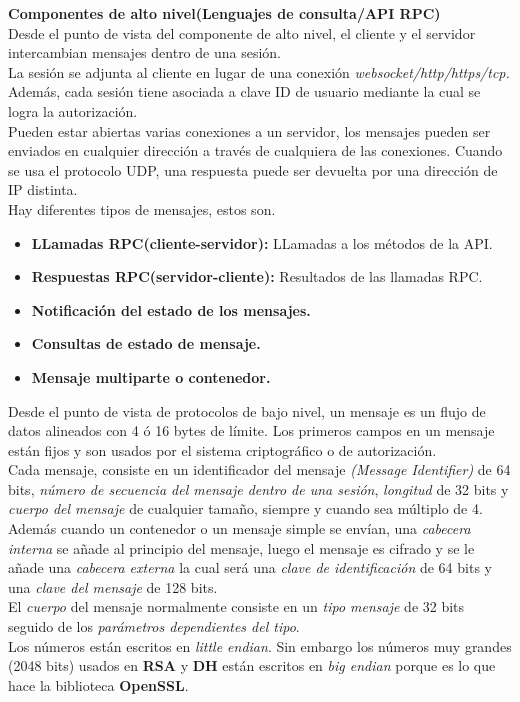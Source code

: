 \textbf{Componentes de alto nivel(Lenguajes de consulta/API RPC)}\\
Desde el punto de vista del componente de alto nivel, el cliente y el servidor intercambian mensajes dentro de una sesión.\\
La sesión se adjunta al cliente en lugar de una conexión \emph{websocket/http/https/tcp.} 
Además, cada sesión tiene asociada a clave ID de usuario mediante la cual se logra la autorización.\\ 
Pueden estar abiertas varias conexiones a un servidor, los mensajes pueden ser enviados en cualquier dirección a través de cualquiera de las conexiones.
Cuando se usa el protocolo UDP, una respuesta puede ser devuelta por una dirección de IP distinta.\\
Hay diferentes tipos de mensajes, estos son.
\begin{itemize}
		\item \textbf{LLamadas RPC(cliente-servidor):} LLamadas a los métodos de la API.
		\item \textbf{Respuestas RPC(servidor-cliente):} Resultados de las llamadas RPC.
		\item \textbf{Notificación del estado de los mensajes.}
		\item \textbf{Consultas de estado de mensaje.}
		\item \textbf{Mensaje multiparte o contenedor.}
\end{itemize}
Desde el punto de vista de protocolos de bajo nivel, un mensaje es un flujo de datos alineados con 4 ó 16 bytes de límite.
Los primeros campos en un mensaje están fijos y son usados por el sistema criptográfico o de autorización.\\
Cada mensaje, consiste en un identificador del mensaje \emph{(Message Identifier)} de 64 bits, \emph{número de secuencia del mensaje dentro de una sesión}, \emph{longitud} de 32 bits y \emph{cuerpo del mensaje} de cualquier tamaño, siempre y cuando sea múltiplo de 4. 
Además cuando un contenedor o un mensaje simple se envían, una \emph{cabecera interna} se añade al principio del mensaje, luego el mensaje es cifrado y se le añade una \emph{cabecera externa} la cual será una \emph{clave de identificación} de 64 bits y una \emph{clave del mensaje} de 128 bits.\\
El \emph{cuerpo} del mensaje normalmente consiste en un \emph{tipo mensaje} de 32 bits seguido de los \emph{parámetros dependientes del tipo}.\\
Los números están escritos en \emph{little endian}. Sin embargo los números muy grandes (2048 bits) usados en \textbf{RSA} y \textbf{DH} están escritos en \emph{big endian} porque es lo que hace la biblioteca \textbf{OpenSSL}.\\

